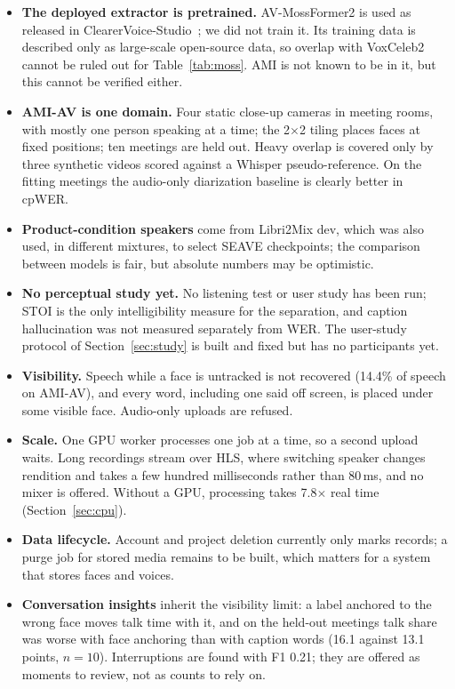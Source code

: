 \documentclass[conference]{IEEEtran}
\begin{document}
\begin{itemize}
\item \textbf{The deployed extractor is pretrained.} AV-MossFormer2 is used as released in ClearerVoice-Studio~\cite{clearervoice}; we did not train it. Its training data is described only as large-scale open-source data, so overlap with VoxCeleb2 cannot be ruled out for Table~\ref{tab:moss}. AMI is not known to be in it, but this cannot be verified either.
\item \textbf{AMI-AV is one domain.} Four static close-up cameras in meeting rooms, with mostly one person speaking at a time; the 2$\times$2 tiling places faces at fixed positions; ten meetings are held out. Heavy overlap is covered only by three synthetic videos scored against a Whisper pseudo-reference. On the fitting meetings the audio-only diarization baseline is clearly better in cpWER.
\item \textbf{Product-condition speakers} come from Libri2Mix dev, which was also used, in different mixtures, to select SEAVE checkpoints; the comparison between models is fair, but absolute numbers may be optimistic.
\item \textbf{No perceptual study yet.} No listening test or user study has been run; STOI is the only intelligibility measure for the separation, and caption hallucination was not measured separately from WER. The user-study protocol of Section~\ref{sec:study} is built and fixed but has no participants yet.
\item \textbf{Visibility.} Speech while a face is untracked is not recovered (14.4\% of speech on AMI-AV), and every word, including one said off screen, is placed under some visible face. Audio-only uploads are refused.
\item \textbf{Scale.} One GPU worker processes one job at a time, so a second upload waits. Long recordings stream over HLS, where switching speaker changes rendition and takes a few hundred milliseconds rather than 80\,ms, and no mixer is offered. Without a GPU, processing takes 7.8$\times$ real time (Section~\ref{sec:cpu}).
\item \textbf{Data lifecycle.} Account and project deletion currently only marks records; a purge job for stored media remains to be built, which matters for a system that stores faces and voices.
\item \textbf{Conversation insights} inherit the visibility limit: a label anchored to the wrong face moves talk time with it, and on the held-out meetings talk share was worse with face anchoring than with caption words (16.1 against 13.1 points, $n{=}10$). Interruptions are found with F1 0.21; they are offered as moments to review, not as counts to rely on.

\end{itemize}
\end{document}
